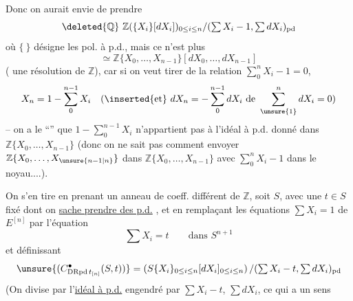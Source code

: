 Donc on aurait envie de prendre
\[
\deleted{\mathbb Q}\ \mathbb Z(\{X_i\}[dX_i])_{0\leq i\leq n}/(\textstyle\sum X_i-1,\sum dX_i)_{\mathrm{pd}}
\]
où $\{\ \}$ désigne les pol. à p.d., mais ce n'est plus
\[
\simeq\mathbb Z\{X_0,\ldots,X_{n-1}\}[dX_0,\ldots,dX_{n-1}]
\]
(   une résolution de $\mathbb Z$), car si on veut tirer de la relation $\sum_0^n X_i-1=0$,
\[
X_n=1-\sum_0^{n-1}X_i\quad
(\inserted{\text{et}}\ dX_n=-\sum_0^{n-1}dX_i\ \text{de }\sum_{\unsure{1}}^n dX_i=0)
\]
-- on a le ``'' que $1-\sum_0^{n-1}X_i$ n'appartient pas à l'idéal à p.d. donné dans $\mathbb Z\{X_0,\ldots,X_{n-1}\}$ (donc on ne sait pas comment envoyer $\mathbb Z\{X_0,\ldots,X_{\unsure{n-1|n}}\}$ dans $\mathbb Z\{X_0,\ldots,X_{n-1}\}$ avec   $\sum_0^n X_i-1$ dans le noyau....).

On s'en tire en prenant un anneau de coeff. différent de $\mathbb Z$, soit $S$, avec une   $t\in S$ fixé dont on \uline{sache prendre des p.d.} , et en remplaçant les équations $\sum X_i=1$ de $E^{[n]}$ par l'équation
\[
\sum X_i=t\qquad\text{dans }S^{n+1}
\]
et définissant
\[
\unsure{(C^\bullet_{\mathrm{DRpd}\,t_{[n]}}(S,t))}=\left(S\{X_i\}_{0\leq i\leq n}[dX_i]_{0\leq i\leq n}\right)/(\textstyle\sum X_i-t,\sum dX_i)_{\mathrm{pd}}
\]
(On divise par l'\uline{idéal à p.d.} engendré par $\sum X_i-t$, $\sum dX_i$, ce qui a un sens
